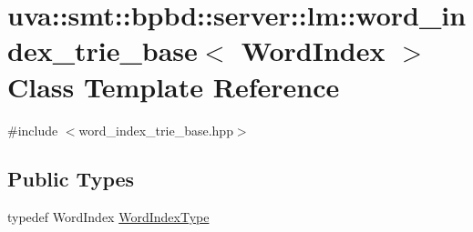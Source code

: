 \hypertarget{classuva_1_1smt_1_1bpbd_1_1server_1_1lm_1_1word__index__trie__base}{}\section{uva\+:\+:smt\+:\+:bpbd\+:\+:server\+:\+:lm\+:\+:word\+\_\+index\+\_\+trie\+\_\+base$<$ Word\+Index $>$ Class Template Reference}
\label{classuva_1_1smt_1_1bpbd_1_1server_1_1lm_1_1word__index__trie__base}


{\ttfamily \#include $<$word\+\_\+index\+\_\+trie\+\_\+base.\+hpp$>$}

\subsection*{Public Types}
\begin{DoxyCompactItemize}
\item 
typedef Word\+Index \hyperlink{classuva_1_1smt_1_1bpbd_1_1server_1_1lm_1_1word__index__trie__base_a64279b5b94c421b25aedaa72e73d013c}{Word\+Index\+Type}
\end{DoxyCompactItemize}

